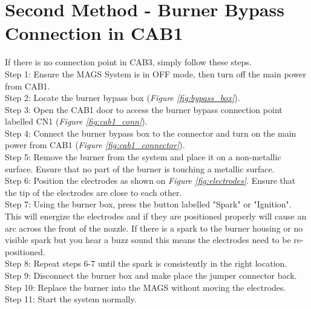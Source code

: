 \newpage
\section{Second Method - Burner Bypass Connection in CAB1}

If there is no connection point in CAB3, simply follow these steps.\\

Step 1: Ensure the MAGS System is in OFF mode, then turn off the main power from CAB1.\\

Step 2: Locate the burner bypass box (\emph{Figure \ref{fig:bypass_box}}).\\

Step 3: Open the CAB1 door to access the burner bypass connection point labelled CN1 (\emph{Figure \ref{fig:cab1_conn}}).\\

Step 4: Connect the burner bypass box to the connector and turn on the main power from CAB1 (\emph{Figure \ref{fig:cab1_connector}}).\\

Step 5: Remove the burner from the system and place it on a non-metallic surface. Ensure that no part of the burner is touching a metallic surface.\\

Step 6: Position the electrodes as shown on \emph{Figure \ref{fig:electrodes}}. Ensure that the tip of the electrodes are close to each other.\\

Step 7: Using the burner box, press the button labelled "Spark" or "Ignition". This will energize the electrodes and if they are positioned properly will cause an arc across the front of the nozzle. If there is a spark to the burner housing or no visible spark but you hear a buzz sound this means the electrodes need to be re-positioned.\\

Step 8: Repeat steps 6-7 until the spark is consistently in the right location.\\

Step 9: Disconnect the burner box and make place the jumper connector back.\\

Step 10: Replace the burner into the MAGS without moving the electrodes.\\

Step 11: Start the system normally.